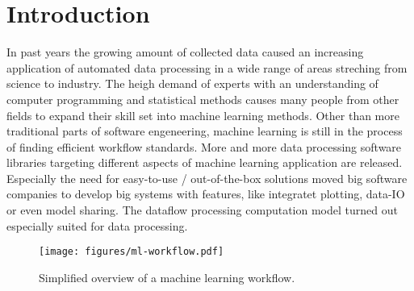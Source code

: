 \documentclass[english]{article}
\begin{document}
\section{Introduction}
In past years the growing amount of collected data caused an increasing application of automated data processing in a wide range of areas streching from  science to industry.
The heigh demand of experts with an understanding of computer programming and statistical methods causes many people from other fields to expand their skill set into machine learning methods. Other than more traditional parts of software engeneering, machine learning is still in the process of finding efficient workflow standards. More and more data processing software libraries targeting different aspects of machine learning application are released. Especially the need for easy-to-use / out-of-the-box solutions moved big software companies to develop big systems with features, like integratet plotting, data-IO or even model sharing. The dataflow processing computation model turned out especially suited for data processing.

\begin{figure}[h]
  \centering
  \texttt{[image: figures/ml-workflow.pdf]}
  \caption{Simplified overview of a machine learning workflow.}
  \label{ml-workflow}
\end{figure}
\end{document}
